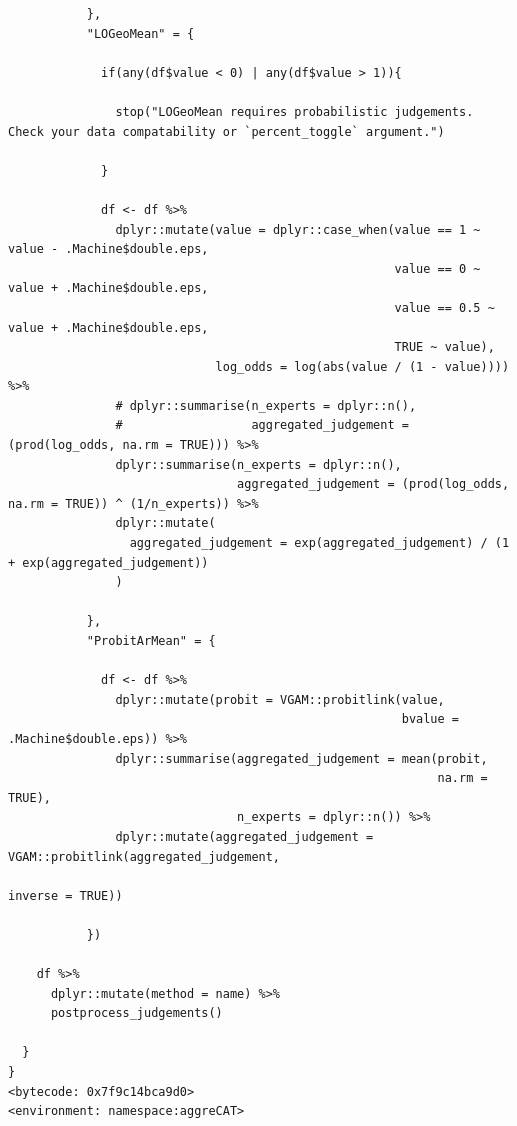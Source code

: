 \documentclass[article]{jss}
\begin{document}
\begin{tcolorbox}[enhanced jigsaw, left=2mm, opacityback=0, leftrule=.75mm, colback=white, colframe=quarto-callout-color-frame, arc=.35mm, rightrule=.15mm, breakable, bottomrule=.15mm, toprule=.15mm]
\begin{verbatim}
           },
           "LOGeoMean" = {

             if(any(df$value < 0) | any(df$value > 1)){

               stop("LOGeoMean requires probabilistic judgements. Check your data compatability or `percent_toggle` argument.")

             }

             df <- df %>%
               dplyr::mutate(value = dplyr::case_when(value == 1 ~ value - .Machine$double.eps,
                                                      value == 0 ~ value + .Machine$double.eps,
                                                      value == 0.5 ~ value + .Machine$double.eps,
                                                      TRUE ~ value),
                             log_odds = log(abs(value / (1 - value)))) %>%
               # dplyr::summarise(n_experts = dplyr::n(),
               #                  aggregated_judgement = (prod(log_odds, na.rm = TRUE))) %>%
               dplyr::summarise(n_experts = dplyr::n(),
                                aggregated_judgement = (prod(log_odds, na.rm = TRUE)) ^ (1/n_experts)) %>%
               dplyr::mutate(
                 aggregated_judgement = exp(aggregated_judgement) / (1 + exp(aggregated_judgement))
               )

           },
           "ProbitArMean" = {

             df <- df %>%
               dplyr::mutate(probit = VGAM::probitlink(value,
                                                       bvalue = .Machine$double.eps)) %>%
               dplyr::summarise(aggregated_judgement = mean(probit,
                                                            na.rm = TRUE),
                                n_experts = dplyr::n()) %>%
               dplyr::mutate(aggregated_judgement = VGAM::probitlink(aggregated_judgement,
                                                                     inverse = TRUE))

           })

    df %>%
      dplyr::mutate(method = name) %>%
      postprocess_judgements()

  }
}
<bytecode: 0x7f9c14bca9d0>
<environment: namespace:aggreCAT>
\end{verbatim}


\end{tcolorbox}
\end{document}

